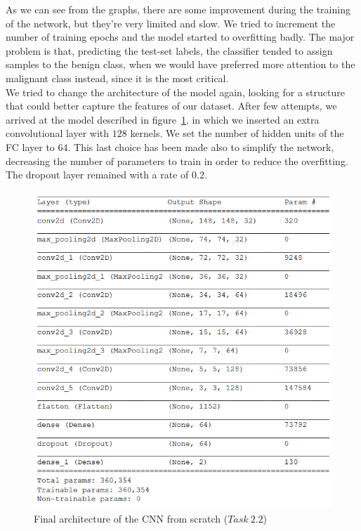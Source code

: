 \documentclass[11pt,a4paper,oneside]{article}
\begin{document}
As we can see from the graphs, there are some improvement during the training of the network, but they're very limited and slow. We tried to increment the number of training epochs and the model started to overfitting badly. The major problem is that, predicting the test-set labels, the classifier tended to assign samples to the benign class, when we would have preferred more attention to the malignant class instead, since it is the most critical.\\

We tried to change the architecture of the model again, looking for a structure that could better capture the features of our dataset. After few attempts, we arrived at the model described in figure~\ref{fig:model_2.2_1}, in which we inserted an extra convolutional layer with $128$ kernels. We set the number of hidden units of the FC layer to $64$. This last choice has been made also to simplify the network, decreasing the number of parameters to train in order to reduce the overfitting. The dropout layer remained with a rate of $0.2$.

\begin{figure}[h]
\centering
\includegraphics[width=.45\textwidth]{images/2.2/1_model}
\caption{Final architecture of the CNN from scratch ($Task\ 2.2$)}
\label{fig:model_2.2_1}
\end{figure}

\clearpage
\end{document}
